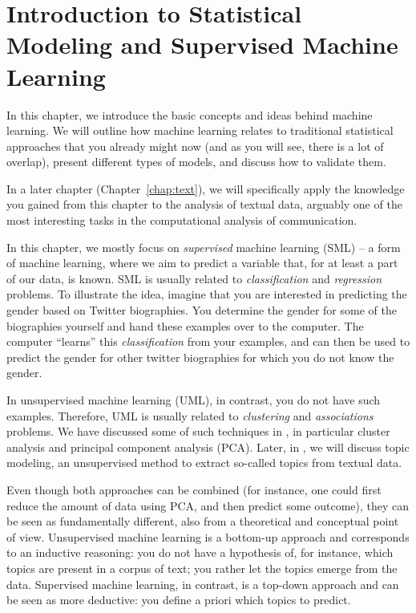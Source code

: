 \chapter{Introduction to Statistical Modeling and Supervised Machine Learning}
\label{chap:introsml}
In this chapter, we introduce the basic concepts and ideas behind
machine learning.  We will outline how machine learning relates to
traditional statistical approaches that you already might now (and as
you will see, there is a lot of overlap), present different types of
models, and discuss how to validate them.

In a later chapter (Chapter~\ref{chap:text}), we will 
specifically apply the knowledge you gained from this chapter to the
analysis of textual data, arguably one of the most interesting tasks
in the computational analysis of communication.

In this chapter, we mostly focus on \emph{supervised} machine learning (SML) 
-- a form of machine learning, where we aim to predict a variable
that, for at least a part of our data, is known. SML is usually related to \textit{classification} and \textit{regression}  problems. To illustrate the
idea, imagine that you are interested in predicting the gender based
on Twitter biographies. You determine the gender for some of the
biographies yourself and hand these examples over to the computer. The
computer ``learns'' this \textit{classification} from your examples, and can then be used to predict the gender for other twitter biographies for which you do not
know the gender.

In unsupervised machine learning (UML), in contrast, you do not have such
examples. Therefore, UML is usually related to \textit{clustering} and \textit{associations} problems. We have discussed some of such techniques in , in particular cluster analysis and
principal component analysis (PCA).
Later, in , we will discuss topic modeling, an unsupervised method to extract so-called topics from textual data.



Even though both approaches can be combined (for instance, one could
first reduce the amount of data using PCA, and then predict some
outcome), they can be seen as fundamentally different, also from a
theoretical and conceptual point of view.  Unsupervised machine
learning is a bottom-up approach and corresponds to an inductive
reasoning: you do not have a hypothesis of, for instance, which topics
are present in a corpus of text; you rather let the topics emerge from
the data.  Supervised machine learning, in contrast, is a top-down
approach and can be seen as more deductive: you define a priori which
topics to predict.










